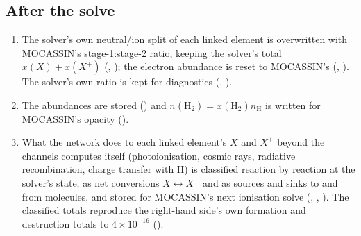 \subsection{After the solve}

\begin{enumerate}
\item The solver's own neutral/ion split of each linked element is
  overwritten with MOCASSIN's stage-1:stage-2 ratio, keeping the solver's
  total $x(X)+x(X^+)$ (, ); the
  electron abundance is reset to MOCASSIN's (, ).
  The solver's own ratio is kept for diagnostics (, ).
\item The abundances are stored () and $n(\mathrm{H_2})=x(\mathrm{H_2})n_{\mathrm H}$
  is written for MOCASSIN's opacity ().
\item What the network does to each linked element's $X$ and $X^+$ beyond the
  channels  computes itself (photoionisation, cosmic rays,
  radiative recombination, charge transfer with H) is classified reaction by
  reaction at the solver's state, as net conversions $X\leftrightarrow X^+$ and
  as sources and sinks to and from molecules, and stored for MOCASSIN's next
  ionisation solve (, , ). The
  classified totals reproduce the right-hand side's own formation and
  destruction totals to $4\times10^{-16}$ ().
\end{enumerate}
